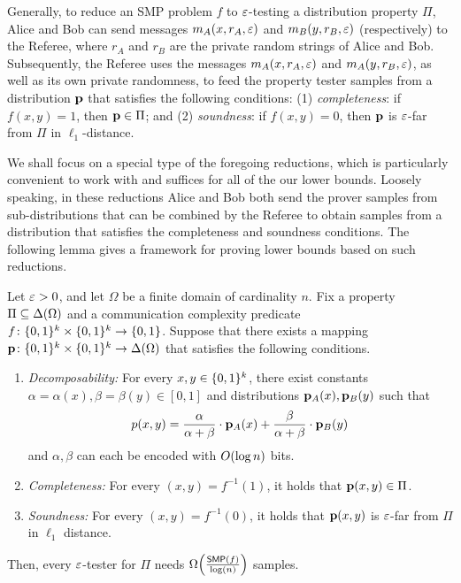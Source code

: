 Generally, to reduce an SMP problem $f$ to $\varepsilon$-testing a distribution property $\Pi$, Alice and Bob can send  messages $m_A(x,r_A,\varepsilon)$ and $m_B(y,r_B,\varepsilon)$ (respectively) to the Referee, where $r_A$ and $r_B$ are the private random strings of Alice and Bob. Subsequently, the Referee uses the messages $m_A(x,r_A,\varepsilon)$ and $m_A(y,r_B,\varepsilon)$, as well as its own private randomness, to feed the property tester samples from a distribution $\mathbf{p}$ that satisfies the following conditions: (1) \emph{completeness}: if $f(x,y)=1$, then $\mathbf{p}\in \Pi$; and (2) \emph{soundness}: if $f(x,y)=0$, then $\mathbf{p}$ is $\varepsilon$-far from $\Pi$ in $\ell_1$-distance.

We shall focus on a special type of the foregoing reductions, which is particularly convenient to work with and suffices for all of the our lower bounds. Loosely speaking, in these reductions Alice and Bob both send the prover samples from sub-distributions that can be combined by the Referee to obtain samples from a distribution that satisfies the completeness and soundness conditions. The following lemma gives a framework for proving lower bounds based on such reductions.

\begin{lemma}\label{lemma:main:methodology:reduction}
	Let $\varepsilon>0$, and let $\Omega$ be a finite domain of cardinality $n$. Fix a property $\Pi \subseteq \Delta\!\left(\Omega\right)$ and a communication complexity predicate $f\colon \{0,1\}^k \times \{0,1\}^k \to \{0,1\}$. Suppose that there exists a mapping $\mathbf{p}\colon\{0,1\}^k \times \{0,1\}^k \to \Delta\!\left(\Omega\right)$ that satisfies the following conditions.
	\begin{enumerate}
		\item \emph{Decomposability:} For every $x,y\in\{0,1\}^k$, there exist constants $\alpha=\alpha(x), \beta=\beta(y) \in [0,1]$ and distributions $\mathbf{p}_A(x), \mathbf{p}_B(y)$ such that 
		\[
		p(x,y) = \frac{\alpha}{\alpha+\beta}\cdot \mathbf{p}_A(x) + \frac{\beta}{\alpha+\beta}\cdot \mathbf{p}_B(y)
		\] 
		and $\alpha,\beta$ can each be encoded with $\bigO{\log n}$ bits.
		\item \emph{Completeness:} For every $(x,y) = f^{-1}(1)$, it holds that $\mathbf{p}(x,y) \in \Pi$.
		\item \emph{Soundness:} For every $(x,y) = f^{-1}(0)$, it holds that $\mathbf{p}(x,y)$ is $\varepsilon$-far from $\Pi$ in $\ell_1$ distance.
	\end{enumerate}
	Then, every $\varepsilon$-tester for $\Pi$ needs $\bigOmega{\frac{\SMP(f)}{\log(n)}}$ samples.
\end{lemma}

